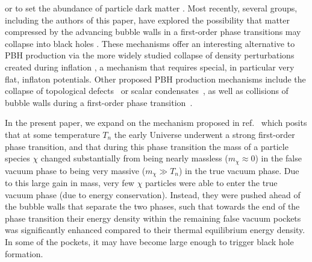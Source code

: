\documentclass[
onecolumn, %
11pt, %
tightenlines,
superscriptaddress, %
nofootinbib, %
preprintnumbers, %
prd %
]{revtex4-1}
\begin{document}
or to set the abundance of particle dark matter \cite{
  Baker:2016xzo,      %
  Baker:2017zwx,      %
  Baker:2018vos,      %
  Baker:2019ndr}.     %
Most recently, several groups, including the authors of this paper, have explored the possibility that matter compressed by the advancing bubble walls in a first-order phase transitions may collapse into black holes \cite{Gross:2021qgx, Baker:2021nyl, Kawana:2021tde}. These mechanisms offer an interesting alternative to PBH production via the more widely studied collapse of density perturbations created during inflation \cite{
  Carr:1975qj,
  Ivanov:1994pa,
  Garcia-Bellido:1996mdl,
  Silk:1986vc,
  Kawasaki:1997ju,
  Yokoyama:1995ex,
  Pi:2017gih},
a mechanism that requires special, in particular very flat, inflaton potentials. Other proposed PBH production mechanisms include the collapse of topological defects~\cite{
  Hawking:1987bn,
  Polnarev:1988dh,
  MacGibbon:1997pu,
  Rubin:2000dq,
  Rubin:2001yw,
  Ashoorioon:2020hln,
  Brandenberger:2021zvn}
or scalar condensates~\cite{
  Cotner:2016cvr,
  Cotner:2019ykd},
as well as collisions of bubble walls during a first-order phase transition~\cite{
  Crawford:1982yz,
  Kodama:1982sf,
  Moss:1994pi,          %
  Freivogel:2007fx,     %
  Hawking:1982ga,       %
  Johnson:2011wt,       %
  Kusenko:2020pcg}.

In the present paper, we expand on the mechanism proposed in ref.~\cite{Baker:2021nyl} which posits that at some temperature $T_n$ the early Universe underwent a strong first-order phase transition, and that during this phase transition the mass of a particle species $\chi$ changed substantially from being nearly massless ($m_\chi \approx 0$) in the false vacuum phase to being very massive ($m_\chi \gg T_n$) in the true vacuum phase.  Due to this large gain in mass, very few $\chi$ particles were able to enter the true vacuum phase (due to energy conservation).  Instead, they were pushed ahead of the bubble walls that separate the two phases, such that towards the end of the phase transition their energy density within the remaining false vacuum pockets was significantly enhanced compared to their thermal equilibrium energy density. In some of the pockets, it may have become large enough to trigger black hole formation.
\end{document}
